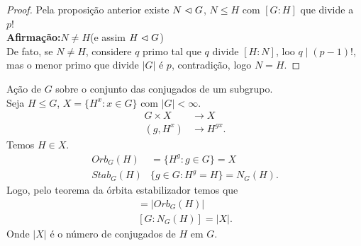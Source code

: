\begin{proof} 
  Pela proposição anterior existe $N\vartriangleleft G$, $N\leq H$ com $[G:H]$ que divide a $p!$\\
  \textbf{Afirmação:}$N\neq H$(e assim $H\vartriangleleft G$)\\
  De fato, se $N\neq H$, considere $q$ primo tal que $q$ divide $[H:N]$, loo $q\mid (p-1)!$, mas o menor primo que divide $|G|$ é $p$, contradição, logo $N=H$. 
\end{proof}
\begin{example}
  Ação de $G$ sobre o conjunto das conjugados de um subgrupo.\\
  Seja $H\leq G$, $X=\{H^{x}:x\in G\}$ com $|G|<\infty$.\\
  \begin{align*}
    G\times X&\to X\\
    (g,H^{x})&\to H^{gx}.
  \end{align*}
  Temos $H\in X$.\\
  \begin{align*}
    Orb_{G}(H)&=\{H^{g}:g\in G\}=X\\
    Stab_{G}(H)&\{g\in G:H^{g}=H\}=N_{G}(H).
  \end{align*}
  Logo, pelo teorema da órbita estabilizador temos que
  \begin{align*}
    [G:Stab_{G}(H)]=|Orb_{G}(H)|\\
    [G:N_{G}(H)]=|X|.
  \end{align*}
  Onde $|X|$ é o número de conjugados de $H$ em $G$. 
\end{example}
